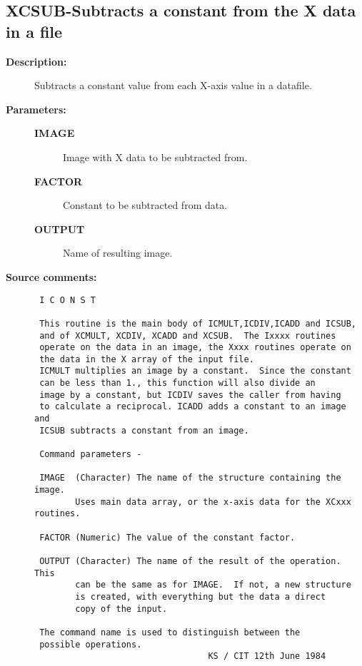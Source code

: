 \subsection{XCSUB-\label{XCSUB}Subtracts a constant from the X data in a file}
\begin{description}

\item [{\bf Description:}]
 Subtracts a constant value from each X-axis value in a datafile.

\item [{\bf Parameters:}]
\begin{description}
\item [{\bf IMAGE}]
 Image with X data to be subtracted from.
\item [{\bf FACTOR}]
 Constant to be subtracted from data.
\item [{\bf OUTPUT}]
 Name of resulting image.
\end{description}

\item [{\bf Source comments:}]
\begin{verbatim}
 I C O N S T

 This routine is the main body of ICMULT,ICDIV,ICADD and ICSUB,
 and of XCMULT, XCDIV, XCADD and XCSUB.  The Ixxxx routines
 operate on the data in an image, the Xxxx routines operate on
 the data in the X array of the input file.
 ICMULT multiplies an image by a constant.  Since the constant
 can be less than 1., this function will also divide an
 image by a constant, but ICDIV saves the caller from having
 to calculate a reciprocal. ICADD adds a constant to an image and
 ICSUB subtracts a constant from an image.

 Command parameters -

 IMAGE  (Character) The name of the structure containing the image.
        Uses main data array, or the x-axis data for the XCxxx routines.

 FACTOR (Numeric) The value of the constant factor.

 OUTPUT (Character) The name of the result of the operation.  This
        can be the same as for IMAGE.  If not, a new structure
        is created, with everything but the data a direct
        copy of the input.

 The command name is used to distinguish between the
 possible operations.
                                  KS / CIT 12th June 1984
\end{verbatim}
\end{description}
